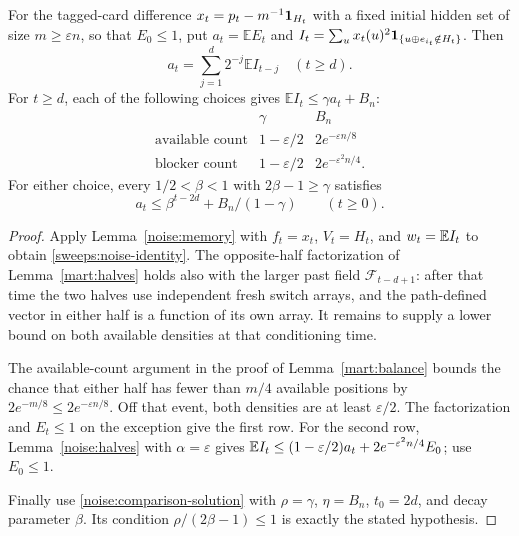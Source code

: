 \begin{lemma}\label{sweeps:refresh}
For the tagged-card difference $x_t=p_t-m^{-1}{\bf1}_{H_t}$ with a fixed
initial hidden set of size $m\ge\varepsilon n$, so that $E_0\le1$, put
$a_t=\mathbb E E_t$ and
$I_t=\sum_u x_t(u)^2{\bf1}_{\{u\oplus e_{i_t}\notin H_t\}}$.
Then
\begin{equation}\label{sweeps:noise-identity}
 a_t=\sum_{j=1}^d2^{-j}\mathbb E I_{t-j}\quad(t\ge d).
\end{equation}
For $t\ge d$, each of the following choices gives
$\mathbb E I_t\le\gamma a_t+B_n$:
\[
 \begin{array}{c|c|c}
 &\gamma&B_n\\ \hline
 \text{available count}&1-\varepsilon/2&2e^{-\varepsilon n/8}\\
 \text{blocker count}&1-\varepsilon/2&2e^{-\varepsilon^2n/4}.
 \end{array}
\]
For either choice, every $1/2<\beta<1$ with $2\beta-1\ge\gamma$ satisfies
\begin{equation}\label{sweeps:refresh-bound}
 a_t\le\beta^{t-2d}+B_n/(1-\gamma)\qquad(t\ge0).
\end{equation}
\end{lemma}
\begin{proof}
Apply Lemma~\ref{noise:memory} with $f_t=x_t$, $V_t=H_t$, and
$w_t=\mathbb E I_t$ to obtain \eqref{sweeps:noise-identity}. The opposite-half
factorization of Lemma~\ref{mart:halves} holds also with the larger
past field $\mathcal F_{t-d+1}$: after that time the two halves use
independent fresh switch arrays, and the path-defined vector in either
half is a function of its own array. It remains to supply a lower
bound on both available densities at that conditioning time.

The available-count argument in the proof of Lemma~\ref{mart:balance}
bounds the chance that either half has fewer than $m/4$ available
positions by $2e^{-m/8}\le2e^{-\varepsilon n/8}$. Off that event,
both densities are at least $\varepsilon/2$. The factorization and
$E_t\le1$ on the exception give the first row. For the second row,
Lemma~\ref{noise:halves} with $\alpha=\varepsilon$ gives
$\mathbb E I_t\le(1-\varepsilon/2)a_t+2e^{-\varepsilon^2n/4}E_0$;
use $E_0\le1$.

Finally use \eqref{noise:comparison-solution} with
$\rho=\gamma$, $\eta=B_n$, $t_0=2d$, and decay parameter $\beta$.
Its condition $\rho/(2\beta-1)\le1$ is exactly the stated hypothesis.
\end{proof}

